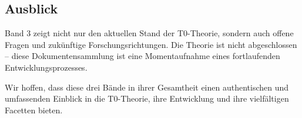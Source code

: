 \subsection*{Ausblick}

Band 3 zeigt nicht nur den aktuellen Stand der T0-Theorie, sondern auch offene Fragen und zukünftige Forschungsrichtungen. Die Theorie ist nicht abgeschlossen -- diese Dokumentensammlung ist eine Momentaufnahme eines fortlaufenden Entwicklungsprozesses.

\vspace{1em}
\noindent
Wir hoffen, dass diese drei Bände in ihrer Gesamtheit einen authentischen und umfassenden Einblick in die T0-Theorie, ihre Entwicklung und ihre vielfältigen Facetten bieten.


